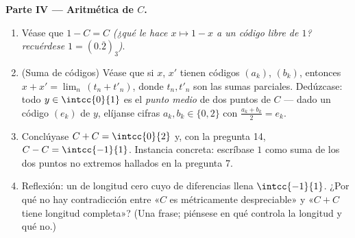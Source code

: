 \begin{problem}[{Problema del fin de semana --- el \omterm{pb:b1:topology:1}{conjunto de Cantor}
de los tercios centrales: longitud cero, no numerable, perfecto y
$C + C = \intcc{0}{2}$}]
\medskip
\noindent\textbf{Parte IV --- Aritmética de $C$.}
\begin{enumerate}[resume]
  \item Véase que $1 - C = C$ \emph{(¿qué le hace $x \mapsto 1 - x$ a
        un código libre de $1$? recuérdese $1 = (0.\overline{2})_3$)}.
  \item (Suma de códigos) Véase que si $x$, $x'$ tienen códigos
        $(a_k)$, $(b_k)$, entonces $x + x' = \lim_n\,(t_n + t'_n)$,
        donde $t_n, t'_n$ son las sumas parciales. Dedúzcase: todo
        $y \in \intcc{0}{1}$ es el \emph{punto medio} de dos puntos de
        $C$ --- dado un código $(e_k)$ de $y$, elíjanse cifras
        $a_k, b_k \in \{0, 2\}$ con $\frac{a_k + b_k}{2} = e_k$.
  \item Conclúyase $C + C = \intcc{0}{2}$ y, con la pregunta 14,
        $C - C = \intcc{-1}{1}$. Instancia concreta: escríbase $1$
        como suma de los dos puntos no extremos hallados en la
        pregunta 7.
  \item Reflexión: un  de longitud cero cuyo  de
        diferencias llena $\intcc{-1}{1}$. ¿Por qué no hay
        contradicción entre «$C$ es métricamente despreciable» y
        «$C + C$ tiene longitud completa»? (Una frase; piénsese en
        qué controla la longitud y qué no.)
\end{enumerate}


\end{problem}
